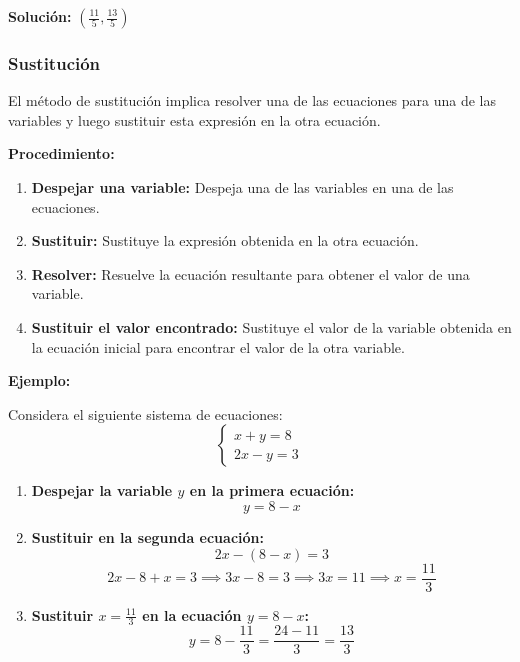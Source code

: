     \textbf{Solución:} \( \left( \frac{11}{5}, \frac{13}{5} \right) \)
    
     
    
    \subsubsection{Sustitución}
    
    El método de sustitución implica resolver una de las ecuaciones para una de las variables y luego sustituir esta expresión en la otra ecuación.
    
    \textbf{Procedimiento:}
    \begin{enumerate}
        \item \textbf{Despejar una variable:} Despeja una de las variables en una de las ecuaciones.
        \item \textbf{Sustituir:} Sustituye la expresión obtenida en la otra ecuación.
        \item \textbf{Resolver:} Resuelve la ecuación resultante para obtener el valor de una variable.
        \item \textbf{Sustituir el valor encontrado:} Sustituye el valor de la variable obtenida en la ecuación inicial para encontrar el valor de la otra variable.
    \end{enumerate}
    
    \textbf{Ejemplo:}
    
    Considera el siguiente sistema de ecuaciones:
    \[
    \begin{cases}
    x + y = 8 \\
    2x - y = 3
    \end{cases}
    \]
    
    \begin{enumerate}
        \item \textbf{Despejar la variable \(y\) en la primera ecuación:}
            \[
            y = 8 - x
            \]
        \item \textbf{Sustituir en la segunda ecuación:}
            \[
            2x - (8 - x) = 3
            \]
            \[
            2x - 8 + x = 3 \implies 3x - 8 = 3 \implies 3x = 11 \implies x = \frac{11}{3}
            \]
        \item \textbf{Sustituir \(x = \frac{11}{3}\) en la ecuación \(y = 8 - x\):}
            \[
            y = 8 - \frac{11}{3} = \frac{24 - 11}{3} = \frac{13}{3}
            \]
    \end{enumerate}
    
